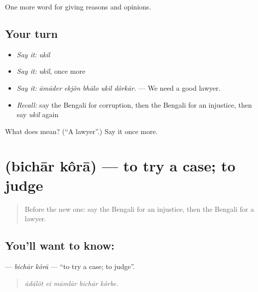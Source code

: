 \begin{grammarlens}[title={What you've built}]
One more word for giving reasons and opinions.
\end{grammarlens}

\subsection*{Your turn}
\begin{itemize}
\raggedright
  \item \emph{Say it:} \emph{ukil}
  \item \emph{Say it:} \emph{ukil}, once more
  \item \emph{Say it:} \emph{āmāder ekjôn bhālo ukil dôrkār.} — We need a good lawyer.
  \item \emph{Recall:} say the Bengali for corruption, then the Bengali for an injustice, then say \emph{ukil} again
\end{itemize}

\begin{tcolorbox}[breakable,colback=teal!4,colframe=teal!35!black,title={Before you move on}]
What does  mean? (\textquotedblleft{}A lawyer\textquotedblright{}.) Say it once more.
\end{tcolorbox}
\section[\texorpdfstring{\bn{বিচার} \bn{করা} (bichār kôrā)}{বিচার করা (bichār kôrā)}]{  (bichār kôrā) — to try a case; to judge}

\label{lesson:BN-C342-bichar-kora}



\begin{quote}
Before the new one: say the Bengali for an injustice, then the Bengali for a lawyer.
\end{quote}

\subsection*{You'll want to know:  }
\textbf{ } — \emph{bichār kôrā} — \textquotedblleft{}to try a case; to judge\textquotedblright{}.

\begin{quote}
    
\end{quote}

\begin{quote}
\emph{ādālôt ei māmlār bichār kôrbe.}
\end{quote}

